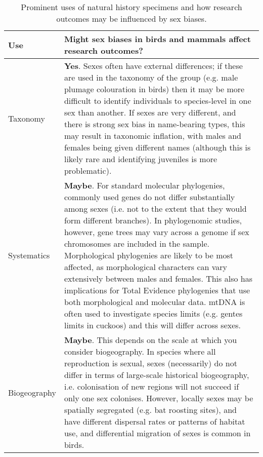 
\begin{longtable}{p{3cm} p{16cm}}

\caption{Prominent uses of natural history specimens and how research outcomes may be influenced by sex biases.}\\ 
  
  \hline
  \textbf{Use} & \textbf{Might sex biases in birds and mammals affect research outcomes?}\\ 

  \hline
  Taxonomy & \textbf{Yes}. Sexes often have external differences; if these are used in the taxonomy of the group (e.g. male plumage colouration in birds\cite{paxton2009utility}) then it may be more difficult to identify individuals to species-level in one sex than another. If sexes are very different, and there is strong sex bias in name-bearing types, this may result in taxonomic inflation, with males and females being given different names (although this is likely rare and identifying juveniles is more problematic).\\ 

  Systematics & \textbf{Maybe}. For standard molecular phylogenies, commonly used genes do not differ substantially among sexes (i.e. not to the extent that they would form different branches). In phylogenomic studies, however, gene trees may vary across a genome if sex chromosomes are included in the sample\cite{reddy2017}. Morphological phylogenies are likely to be most affected, as morphological characters can vary extensively between males and females. This also has implications for Total Evidence phylogenies that use both morphological and molecular data. mtDNA is often used to investigate species limits (e.g. gentes limits in cuckoos\cite{soler2009geographic}) and this will differ across sexes.\\ 

  Biogeography & \textbf{Maybe}. This depends on the scale at which you consider biogeography. In species where all reproduction is sexual, sexes (necessarily) do not differ in terms of large-scale historical biogeography, i.e. colonisation of new regions will not succeed if only one sex colonises. However, locally sexes may be spatially segregated (e.g. bat roosting sites\cite{altringham}), and have different dispersal rates\cite{pusey1987sex} or patterns of habitat use, and differential migration of sexes is common in birds\cite{Woodworth2016}.\\ 


\end{longtable}
